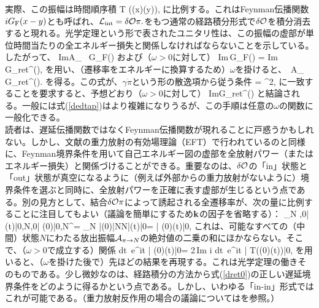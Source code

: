 実際、この振幅は時間順序積
\beq
\label{tfeynm}
\langle T (\delta\calo(x)\delta\calo(y))\rangle,
\eeq
に比例する。これはFeynman伝播関数$iG_{\rm F}(x-y)$とも呼ばれ、${\cal L}_{\rm int} = \delta{\cal O} \pi.$をもつ通常の経路積分形式で$\delta{\cal O}$を積分消去すると現れる。光学定理という形で表されたユニタリ性は、この振幅の虚部が単位時間当たりの全エネルギー損失と関係しなければならないことを示している\cite{dis1,dis2}。したがって、
\beq
{\rm Im}{\cal A}_{\pi\to\pi} \, G_{\rm F}(\omega)
\eeq
および（$\omega>0$に対して）
\beq
\label{imgimf}
{\rm Im}\,G_{\rm F}(\omega) = {\rm Im}\,G_{\rm ret}^\calo(\omega),
\eeq
を用い、（遷移率をエネルギーに換算するため）$\omega$を掛けると、
\beq
{} \simeq {}\,{\cal A}_{\pi\to\pi} \simeq {}G_{\rm ret}^\calo(\omega).
\eeq
を得る。この式が、$\gamma\dot\pi$という形の散逸項から従う条件
\beq {} = \gamma \dot\pi^2, \label{dedtap}\eeq
に一致することを要求すると、予想どおり（$\omega>0$に対して）
\beq
{\rm Im}G_{\rm ret}^\calo(\omega) \simeq \gamma \omega
 \eeq
と結論される。一般には式(\ref{dedtap})はより複雑になりうるが、この手順は任意の$\omega$の関数に一般化できる\cite{dis1,dis2}。\\

読者は、遅延伝播関数ではなくFeynman伝播関数が現れることに戸惑うかもしれない。しかし、文献\cite{nrgr2,nrgr2p,nrgr2p2,radgo,eftrev}の重力放射の有効場理論（EFT）で行われているのと同様に、Feynman境界条件を用いて自己エネルギー図の虚部を全放射パワー（またはエネルギー損失）と関係づけることができる。重要なのは、$\delta{\cal O}$の「in」状態と「out」状態が真空になるように（例えば外部からの重力放射がないように）境界条件を選ぶと同時に、全放射パワーを正確に表す虚部が生じるという点である。別の見方として、結合$\delta{\cal O} \pi$によって誘起される全遷移率が、次の量に比例することに注目してもよい（議論を簡単にするため${\bf k}$の因子を省略する）：
\be
\sum_N    \langle \pi,0|\pi\delta\calo(t)|0,N\rangle \langle \pi,0| \pi\delta\calo(0)|0,N\rangle^\star = \sum_N  |\delta\calo(0)|N\rangle \langle N|\delta\calo(t)|0\rangle = | \delta\calo(0)\delta\calo(t)|0\rangle,
\ee
これは、可能なすべての（中間）状態$N$にわたる放出振幅${\cal A}_{\pi \to N}$の絶対値の二乗の和にほかならない。そこで、（$\omega>0$で成立する）関係
\beq
\int dt\, e^{i\omega t} | \delta\calo(0)\delta\calo(t)|0\rangle = 2\,{\rm Im}\; i \int dt\, e^{i\omega t} | T(\delta\calo(0)\delta\calo(t))|0\rangle,
\eeq
を用いると、（$\omega$を掛けた後で）先ほどの結果を再現する。これは光学定理の働きそのものである。少し微妙なのは、経路積分の方法から式(\ref{dret0})の正しい遅延境界条件をどのように得るかという点である。しかし、いわゆる「in-in」形式ではこれが可能である\cite{calzetta, weiss, Zhang}。（重力放射反作用の場合の議論については\cite{radre}を参照。）

